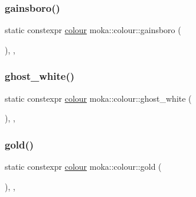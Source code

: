 \subsubsection{\texorpdfstring{gainsboro()}{gainsboro()}}
{\footnotesize\ttfamily static constexpr \mbox{\hyperlink{classmoka_1_1colour}{colour}} moka\+::colour\+::gainsboro (\begin{DoxyParamCaption}{ }\end{DoxyParamCaption})\hspace{0.3cm}{\ttfamily [inline]}, {\ttfamily [static]}, {\ttfamily [noexcept]}}

\mbox{\label{classmoka_1_1colour_a599a544493ece8acc2ee62bdd2604e0e}} 
\subsubsection{\texorpdfstring{ghost\_white()}{ghost\_white()}}
{\footnotesize\ttfamily static constexpr \mbox{\hyperlink{classmoka_1_1colour}{colour}} moka\+::colour\+::ghost\+\_\+white (\begin{DoxyParamCaption}{ }\end{DoxyParamCaption})\hspace{0.3cm}{\ttfamily [inline]}, {\ttfamily [static]}, {\ttfamily [noexcept]}}

\mbox{\label{classmoka_1_1colour_a7827508c0ecde383148625dc72c355d9}} 
\subsubsection{\texorpdfstring{gold()}{gold()}}
{\footnotesize\ttfamily static constexpr \mbox{\hyperlink{classmoka_1_1colour}{colour}} moka\+::colour\+::gold (\begin{DoxyParamCaption}{ }\end{DoxyParamCaption})\hspace{0.3cm}{\ttfamily [inline]}, {\ttfamily [static]}, {\ttfamily [noexcept]}}

\mbox{\label{classmoka_1_1colour_ab65b1a933564a789803b5db12cc6a752}} 

